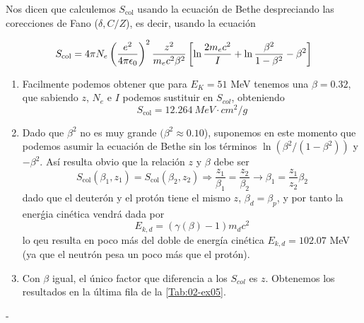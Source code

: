 Nos dicen que calculemos $S_{\text{col}}$ usando la ecuación de Bethe despreciando las corecciones de Fano ($\delta, C/Z$), es decir, usando la ecuación 

\begin{equation*}
S_\text{\text{col}} = 4\pi N_e \left( \frac{e^2}{4\pi \epsilon_0} \right)^2 
\frac{z^2}{m_e c^2 \beta^2} 
\left[ \ln \frac{2 m_e c^2}{I} + \ln \frac{\beta^2}{1 - \beta^2} - \beta^2  \right]
\end{equation*}

\begin{enumerate}[label=\alph*)]
    \item Facilmente podemos obtener que para $E_K=51$ MeV tenemos una $\beta = 0.32$, que sabiendo $z$, $N_e$ e $I$ podemos sustituir en $S_{col}$, obteniendo 
    \[ S_{\text{col}} = 12.264 \ \unit{MeV \cdot cm^2 / g}\]
    \item Dado que $\beta^2$ no es muy grande $(\beta^2 \approx 0.10$), suponemos en este momento que podemos asumir la ecuación de Bethe sin los términos $\ln(\beta^2/(1-\beta^2))$ y $-\beta^2$. Así resulta obvio que la relación $z$ y $\beta$ debe ser
    \begin{equation*}
        S_{\text{col}} (\beta_1,z_1) = S_{\text{col}} (\beta_2,z_2) \Rightarrow \frac{z_1}{\beta_1} = \frac{z_2}{\beta_2} \to \beta_1 = \frac{z_1}{z_2} \beta_2
    \end{equation*}
    dado que el deuterón y el protón tiene el mismo $z$, $\beta_d = \beta_p$, y por tanto la enerǵia cinética vendrá dada por 
    \begin{equation*}
        E_{k,d} = (\gamma(\beta)-1) m_d c^2
    \end{equation*}
    lo qeu resulta en poco más del doble de energía cinética $E_{k,d} = 102.07$ MeV (ya que el neutrón pesa un poco más que el protón). 
    \item Con $\beta$ igual, el único factor que diferencia a los $S_{col}$ es $z$. Obtenemos los resultados en la última fila de la \cref{Tab:02-ex05}.
\end{enumerate}
-
\begingroup
\makeatletter
\let\old@floatboxreset\@floatboxreset
\def\@floatboxreset{\old@floatboxreset\centering} %
\makeatother

\endgroup


